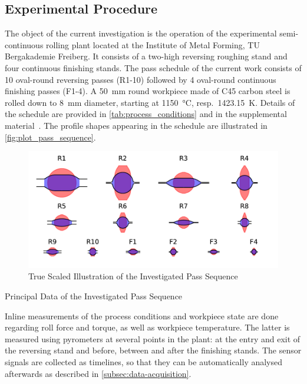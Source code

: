 \subsection{Experimental Procedure}\label{subsec:experimental-procedure}

The object of the current investigation is the operation of the experimental semi-continuous rolling plant located at the Institute of Metal Forming, TU Bergakademie Freiberg.
It consists of a two-high reversing roughing stand and four continuous finishing stands.
The pass schedule of the current work consists of 10 oval-round reversing passes (R1-10) followed by 4 oval-round continuous finishing passes (F1-4).
A \qty{50}{\milli\meter} round workpiece made of C45 carbon steel is rolled down to \qty{8}{\milli\meter} diameter, starting at \qty{1150}{\celsius}, resp.\ \qty{1423.15}{\kelvin}.
Details of the schedule are provided in \autoref{tab:process_conditions} and in the supplemental material~\cite{WeinerVariationSupplemental2024}.
The profile shapes appearing in the schedule are illustrated in \autoref{fig:plot_pass_sequence}.

\begin{figure}
    \centering
    \includegraphics{img/plot_pass_sequence}
    \caption{True Scaled Illustration of the Investigated Pass Sequence}
    \label{fig:plot_pass_sequence}
\end{figure}


\begin{table}
    \centering
    \caption{Principal Data of the Investigated Pass Sequence}
    \label{tab:process_conditions}
    
\end{table}

Inline measurements of the process conditions and workpiece state are done regarding roll force and torque, as well as workpiece temperature.
The latter is measured using pyrometers at several points in the plant: at the entry and exit of the reversing stand and before, between and after the finishing stands.
The sensor signals are collected as timelines, so that they can be automatically analysed afterwards as described in \autoref{subsec:data-acquisition}.

